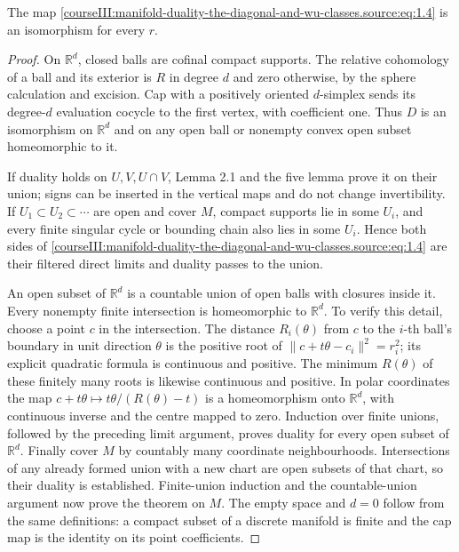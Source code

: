\begin{theorem}
The map \eqref{courseIII:manifold-duality-the-diagonal-and-wu-classes.source:eq:1.4} is an isomorphism for every \(r\).
\end{theorem}
\begin{proof}
On \(\mathbb R^d\), closed balls are cofinal compact supports. The relative cohomology of a ball and its exterior is \(R\) in degree \(d\) and zero otherwise, by the sphere calculation and excision. Cap with a positively oriented \(d\)-simplex sends its degree-\(d\) evaluation cocycle to the first vertex, with coefficient one. Thus \(D\) is an isomorphism on \(\mathbb R^d\) and on any open ball or nonempty convex open subset homeomorphic to it.

If duality holds on \(U,V,U\cap V\), Lemma 2.1 and the five lemma prove it on their union; signs can be inserted in the vertical maps and do not change invertibility. If \(U_1\subset U_2\subset\cdots\) are open and cover \(M\), compact supports lie in some \(U_i\), and every finite singular cycle or bounding chain also lies in some \(U_i\). Hence both sides of \eqref{courseIII:manifold-duality-the-diagonal-and-wu-classes.source:eq:1.4} are their filtered direct limits and duality passes to the union.

An open subset of \(\mathbb R^d\) is a countable union of open balls with closures inside it. Every nonempty finite intersection is homeomorphic to \(\mathbb R^d\). To verify this detail, choose a point \(c\) in the intersection. The distance \(R_i(\theta)\) from \(c\) to the \(i\)-th ball's boundary in unit direction \(\theta\) is the positive root of \(\|c+t\theta-c_i\|^2=r_i^2\); its explicit quadratic formula is continuous and positive. The minimum \(R(\theta)\) of these finitely many roots is likewise continuous and positive. In polar coordinates the map \(c+t\theta\mapsto t\theta/(R(\theta)-t)\) is a homeomorphism onto \(\mathbb R^d\), with continuous inverse and the centre mapped to zero. Induction over finite unions, followed by the preceding limit argument, proves duality for every open subset of \(\mathbb R^d\). Finally cover \(M\) by countably many coordinate neighbourhoods. Intersections of any already formed union with a new chart are open subsets of that chart, so their duality is established. Finite-union induction and the countable-union argument now prove the theorem on \(M\). The empty space and \(d=0\) follow from the same definitions: a compact subset of a discrete manifold is finite and the cap map is the identity on its point coefficients.
\end{proof}

